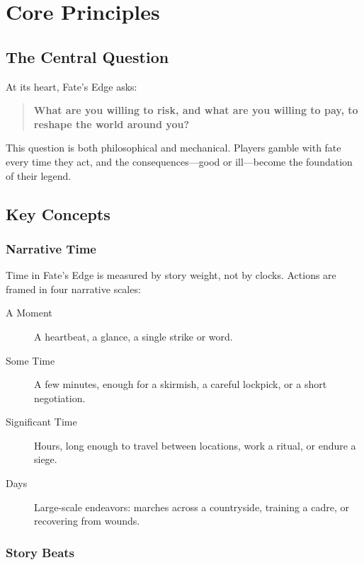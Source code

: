 \chapter{Core Principles}

\section{The Central Question}

At its heart, Fate's Edge asks:
\begin{quote}
\textbf{What are you willing to risk, and what are you willing to pay, to reshape the world around you?}
\end{quote}

This question is both philosophical and mechanical. Players gamble with fate every time they act, and the consequences---good or ill---become the foundation of their legend.

\section{Key Concepts}

\subsection{Narrative Time}

Time in Fate's Edge is measured by story weight, not by clocks. Actions are framed in four narrative scales:

\begin{description}
\item[A Moment] A heartbeat, a glance, a single strike or word.
\item[Some Time] A few minutes, enough for a skirmish, a careful lockpick, or a short negotiation.
\item[Significant Time] Hours, long enough to travel between locations, work a ritual, or endure a siege.
\item[Days] Large-scale endeavors: marches across a countryside, training a cadre, or recovering from wounds.
\end{description}

\subsection{Story Beats}

